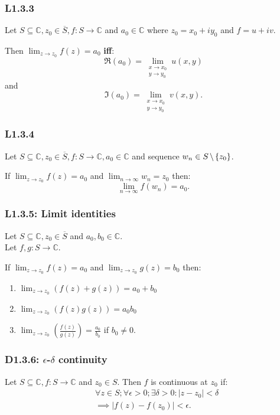 \documentclass{article}
\begin{document}
\begin{multicols*}{3}
\subsubsection*{L1.3.3}
Let $S\subseteq\mathbb{C}, z_0\in\overline{S},
f:S\rightarrow\mathbb{C}$ and $a_0\in\mathbb{C}$ where $z_0=x_0+iy_0$
and $f=u+iv$.

Then $\displaystyle\lim_{z\rightarrow z_0}f(z)=a_0$ \textbf{if{}f}:
$$\Re(a_0)=\lim\limits_{\substack{
    x \to x_0 \\
    y \to y_0}}u(x,y)$$
and
$$\Im(a_0)=\lim\limits_{\substack{
    x \to x_0 \\
    y \to y_0}}v(x,y).$$

\subsubsection*{L1.3.4}
Let $S\subseteq\mathbb{C}, z_0\in\overline{S},
f:S\rightarrow\mathbb{C},a_0\in\mathbb{C}$ and sequence
$w_n\in S\hspace{0.02in}\backslash\hspace{0.02in}\{z_0\}$.

If $\displaystyle\lim_{z\rightarrow z_0}f(z)=a_0$
and $\displaystyle\lim_{n\rightarrow\infty}w_n=z_0$
then:
$$\lim_{n\rightarrow\infty}f(w_n)=a_0.$$

\subsubsection*{L1.3.5: Limit identities}
Let $S\subseteq\mathbb{C}, z_0\in\overline{S}$ and $a_0,b_0\in\mathbb{C}$. \\
Let $f,g:S\rightarrow\mathbb{C}$.

If $\displaystyle\lim_{z\rightarrow z_0}f(z)=a_0$
and $\displaystyle\lim_{z\rightarrow z_0}g(z)=b_0$
then:
\begin{enumerate}
    \item $\displaystyle\lim_{z\rightarrow z_0}
    (f(z)+g(z))=a_0+b_0$

    \item $\displaystyle\lim_{z\rightarrow z_0}
    (f(z)g(z))=a_0 b_0$

    \item $\displaystyle\lim_{z\rightarrow z_0}
    \left(\frac{f(z)}{g(z)}\right)=\frac{a_0}{b_0}$
    if $b_0\neq0$.
\end{enumerate}

\subsubsection*{D1.3.6: $\epsilon$-$\delta$ continuity}
Let $S\subseteq\mathbb{C}, f:S\rightarrow\mathbb{C}$
and $z_0\in S$.
Then $f$ is continuous at $z_0$ if:
\begin{align*}
    &\forall z\in S;\forall\epsilon>0;\exists\delta>0:
    |z-z_0|<\delta \\
    &\implies|f(z)-f(z_0)|<\epsilon.
\end{align*}


\end{multicols*}
\end{document}
